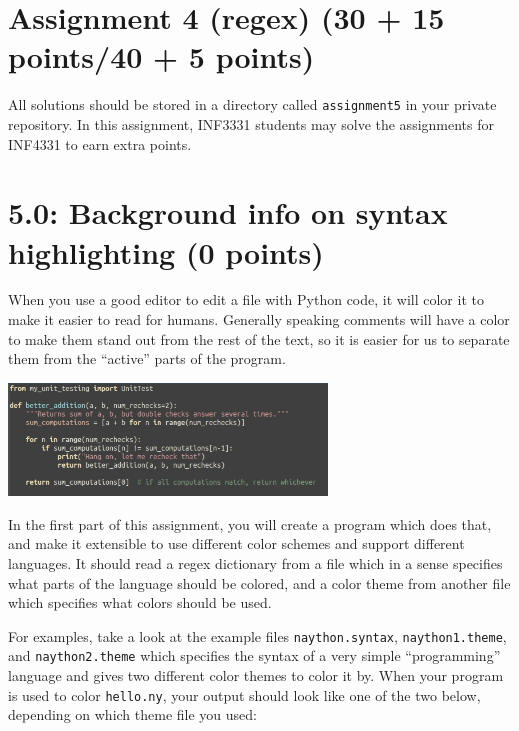 \documentclass[english]{article}
\begin{document}
\newcommand{\Ci}{ \mathbb{C} }
\newcommand{\C}{ $\Ci$ }

{\lstset{language=bash, showstringspaces=false}}
{}

{\lstset{language=python, showstringspaces=false}}
{}


\section{Assignment 4 (regex) (30 + 15 points/40 + 5 points)}
All solutions should be stored in a directory called \texttt{assignment5} in your private repository.
In this assignment, INF3331 students may solve the assignments for INF4331 to earn extra points.

\section{5.0: Background info on syntax highlighting (0 points)}
When you use a good editor to edit a file with Python code, it will color it to make it easier to read for humans. Generally speaking comments will have a color to make them stand out from the rest of the text, so it is easier for us to separate them from the ``active'' parts of the program.

\begin{center}
  \includegraphics[height=3cm]{coloring_example.jpg}
\end{center}

In the first part of this assignment, you will create a program which does that, and make it extensible to use different color schemes and support different languages. It should read a regex dictionary from a file which in a sense specifies what parts of the language should be colored, and a color theme from another file which specifies what colors should be used.

For examples, take a look at the example files \texttt{naython.syntax}, \texttt{naython1.theme}, and \texttt{naython2.theme} which specifies the syntax of a very simple ``programming'' language and gives two different color themes to color it by. When your program is used to color \texttt{hello.ny}, your output should look like one of the two below, depending on which theme file you used:
\end{document}
